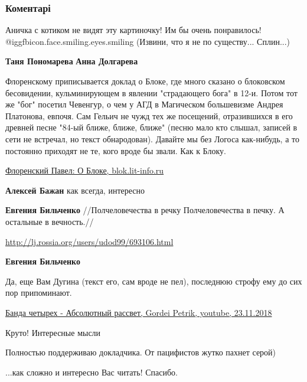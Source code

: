  
 
 
 
 
\subsubsection{Коментарі}

\begin{itemize} %

Аничка с котиком не видят эту картиночку! Им бы очень понравилось!
@igg{fbicon.face.smiling.eyes.smiling}  (Извини, что я не по существу...
Сплин...)

\textbf{Таня Пономарева} \textbf{Анна Долгарева}


Флоренскому приписывается доклад о Блоке, где много сказано о блоковском
бесовидении, кульминирующем в явлении "страдающего бога" в 12-и. Потом тот же
"бог" посетил Чевенгур, о чем у АГД в Магическом большевизме Андрея Платонова,
евпочя. Сам Гельич не чужд тех же посещений, отразившихся в его древней песне
"84-ый ближе, ближе, ближе" (песню мало кто слышал, записей в сети не встречал,
но текст обнародован). Давайте мы без Логоса как-нибудь, а то постоянно
приходят не те, кого вроде бы звали. Как к Блоку.

\href{http://blok.lit-info.ru/blok/kritika-o-bloke/florenskij-pavel-o-bloke.htm}{%
Флоренский Павел: О Блоке, blok.lit-info.ru%
}

\begin{itemize} %
\textbf{Алексей Бажан} как всегда, интересно

\textbf{Евгения Бильченко} 
//Полчеловечества в речку
Полчеловечества в печку.
А остальные в вечность.//

\url{http://lj.rossia.org/users/udod99/693106.html}

\textbf{Евгения Бильченко} 

Да, еще Вам Дугина (текст его, сам вроде не пел), последнюю строфу ему до сих
пор припоминают. 

\href{https://www.youtube.com/watch?v=KKG5MgWcG5I}{%
Банда четырех - Абсолютный рассвет, Gordei Petrik, youtube, 23.11.2018%
}

\end{itemize} %

Круто! Интересные мысли

Полностью поддерживаю докладчика. От пацифистов жутко пахнет серой)

...как сложно и интересно Вас читать! Спасибо.

\end{itemize} %
